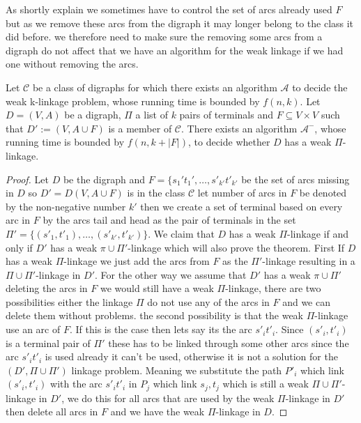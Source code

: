 As shortly explain we sometimes have to control the set of arcs already used $F$ but as we remove these arcs from the digraph it may longer belong to the class it did before. we therefore need to make sure the removing some arcs from a digraph do not affect that we have an algorithm for the weak linkage if we had one without removing the arcs.
\begin{lemma}
    Let $\mathcal{C}$ be a class of digraphs for which there exists an algorithm $\mathcal{A}$ to decide the weak k-linkage problem, whose running time is bounded by $f(n,k)$. Let $D=(V,A)$ be a digraph, $\Pi$ a list of $k$ pairs of terminals and $F\subseteq V\times V$ such that $D':= (V,A\cup F)$ is a member of $\mathcal{C}$. There exists an algorithm  $\mathcal{A}^-$, whose running time is bounded by $f(n,k+|F|)$, to decide whether $D$ has a weak $\Pi$-linkage.
    \label{lemma:deletarcs}
\end{lemma}
\begin{proof}
    Let $D$ be the digraph and $F=\lbrace s_1't_1',\dots ,s'_{k'}t'_{k'}$ be the set of arcs missing in $D$ so $D'=D(V,A\cup F)$ is in the class $\mathcal{C}$ let number of arcs in $F$ be denoted by the non-negative number $k'$ then we create a set of terminal based on every arc in $F$ by the arcs tail and head as the pair of terminals in the set $\Pi'=\lbrace (s'_1,t'_1),\dots ,(s'_{k'},t'_{k'})\rbrace$. 
    We claim that $D$ has a weak $\Pi$-linkage if and only if $D'$ has a weak $\pi \cup \Pi'$-linkage which will also prove the theorem. 
    First If $D$ has a weak $\Pi$-linkage we just add the arcs from $F$ as the $\Pi'$-linkage resulting in a $\Pi \cup \Pi'$-linkage in $D'$. 
    For the other way we assume that $D'$ has a weak $\pi \cup \Pi'$ deleting the arcs in $F$ we would still have a weak $\Pi$-linkage, there are two possibilities either the linkage $\Pi$ do not use any of the arcs in $F$ and we can delete them without problems.
    the second possibility is that the weak $\Pi$-linkage use an arc of $F$.
    If this is the case then lets say its the arc $s'_it'_i$. 
    Since $(s'_i,t'_i)$ is a terminal pair of $\Pi'$ these has to be linked through some other arcs since the arc $s'_it'_i$ is used already it can't be used, otherwise it is not a solution for the $(D',\Pi \cup \Pi')$ linkage problem.
    Meaning we substitute the path $P'_i$ which link $(s'_i,t'_i)$ with the arc $s'_it'_i$ in $P_j$ which link $s_j,t_j$ which is still a weak $\Pi \cup \Pi'$-linkage in $D'$, we do this for all arcs that are used by the weak $\Pi$-linkage in $D'$ then delete all arcs in $F$ and we have the weak $\Pi$-linkage in $D$.
\end{proof}

